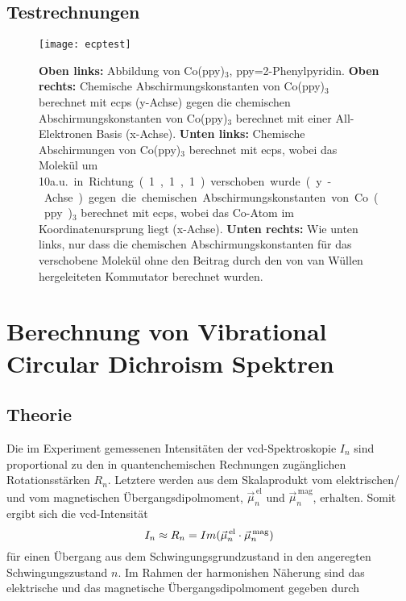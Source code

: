 	\subsection{Testrechnungen}
		\begin{figure}[ht!]
	\centering
	\texttt{[image: ecptest]}
	\captionsetup{figurewithin = chapter}
	\captionsetup{font=small, labelfont=bf}\caption[ECP-Testrechnungen an Co(ppy)$_3$]{\textbf{Oben links:} Abbildung von Co(ppy)$_3$, ppy=2-Phenylpyridin. \textbf{Oben rechts:} Chemische Abschirmungskonstanten von Co(ppy)$_3$ berechnet mit \acp{ecp} (y-Achse) gegen die chemischen Abschirmungskonstanten von Co(ppy)$_3$ berechnet mit einer All-Elektronen Basis (x-Achse). \textbf{Unten links:} Chemische Abschirmungen von Co(ppy)$_3$  berechnet mit \acp{ecp}, wobei das Molekül um 10\unit{a.u.} in Richtung (1,1,1) verschoben wurde (y-Achse) gegen die chemischen Abschirmungskonstanten von Co(ppy)$_3$ berechnet mit \acp{ecp}, wobei das Co-Atom im Koordinatenursprung liegt (x-Achse). \textbf{Unten rechts:} Wie unten links, nur dass die chemischen Abschirmungskonstanten für das verschobene Molekül ohne den Beitrag durch den von van Wüllen hergeleiteten Kommutator berechnet wurden.}
\label{abb:coppy3test}
\end{figure}
	
\section{Berechnung von Vibrational Circular Dichroism Spektren}
	\subsection{Theorie}
	Die im Experiment gemessenen Intensitäten der \ac{vcd}-Spektroskopie $I_n$ sind proportional zu den in quantenchemischen Rechnungen zugänglichen Rotationsstärken $R_n$. Letztere werden aus dem Skalaprodukt vom elektrischen/ und vom magnetischen Übergangsdipolmoment, $\vec{\mu}_n^{\,\text{el}}$ und $\vec{\mu}_n^{\,\text{mag}}$,  erhalten. Somit ergibt sich die \ac{vcd}-Intensität
	\begin{equation}
	  I_n\approx R_n = Im(\vec{\mu}_n^{\,\text{el}}\cdot\vec{\mu}_n^{\text{\,mag}})
	\end{equation}
	für einen Übergang aus dem Schwingungsgrundzustand in den angeregten Schwingungszustand $n$.\supercite{stephens1985theory,stephens1985vibrational} Im Rahmen der harmonishen Näherung sind das elektrische und das magnetische Übergangsdipolmoment gegeben durch\supercite{cheeseman1996ab,nicu2008vibrational}
	
